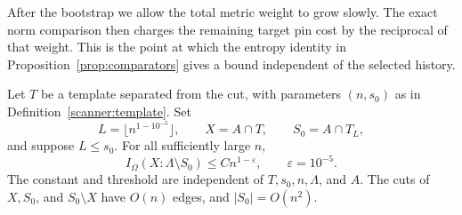 After the bootstrap we allow the total metric weight to grow slowly.
The exact norm comparison then charges the remaining target pin cost by
the reciprocal of that weight.  This is the point at which the entropy
identity in Proposition~\ref{prop:comparators} gives a bound independent
of the selected history.

\begin{proposition}
\label{prop:collar}
Let \(T\) be a template separated from the cut, with parameters
\((n,s_0)\) as in Definition~\ref{scanner:template}.  Set
\[
 L=\lfloor n^{1-10^{-5}}\rfloor,
 \qquad X=A\cap T,
 \qquad S_0=A\cap T_L,
\]
and suppose \(L\le s_0\).  For all sufficiently large \(n\),
\begin{equation}
 I_\Omega(X:\Lambda\setminus S_0)
       \le C n^{1-\varepsilon},\qquad \varepsilon=10^{-5}.
 \label{scanner:collar-output}
\end{equation}
The constant and threshold are independent of \(T,s_0,n,\Lambda\),
and \(A\).  The cuts of \(X,S_0\), and \(S_0\setminus X\) have
\(O(n)\) edges, and \(|S_0|=O(n^2)\).
\end{proposition}

